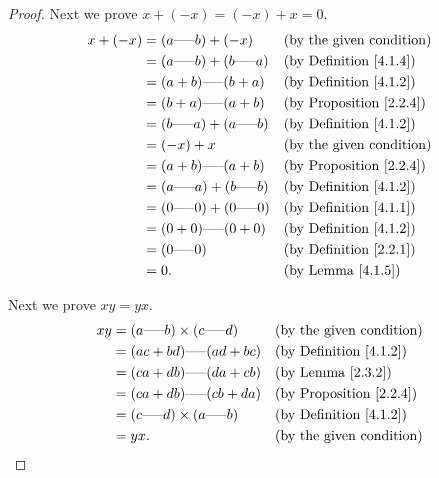 \begin{proof}
Next we prove \(x + (-x) = (-x) + x = 0\).
\begin{align*}
x + (-x) &= (a \text{-----} b) + (-x) && \text{(by the given condition)} \\
&= (a \text{-----} b) + (b \text{-----} a) && \text{(by Definition \ref{4.1.4})} \\
&= (a + b) \text{-----} (b + a) && \text{(by Definition \ref{4.1.2})} \\
&= (b + a) \text{-----} (a + b) && \text{(by Proposition \ref{2.2.4})} \\
&= (b \text{-----} a) + (a \text{-----} b) && \text{(by Definition \ref{4.1.2})} \\
&= (-x) + x && \text{(by the given condition)} \\
&= (a + b) \text{-----} (a + b) && \text{(by Proposition \ref{2.2.4})} \\
&= (a \text{-----} a) + (b \text{-----} b) && \text{(by Definition \ref{4.1.2})} \\
&= (0 \text{-----} 0) + (0 \text{-----} 0) && \text{(by Definition \ref{4.1.1})} \\
&= (0 + 0) \text{-----} (0 + 0) && \text{(by Definition \ref{4.1.2})} \\
&= (0 \text{-----} 0) && \text{(by Definition \ref{2.2.1})} \\
&= 0. && \text{(by Lemma \ref{4.1.5})}
\end{align*}

Next we prove \(xy = yx\).
\begin{align*}
xy &= (a \text{-----} b) \times (c \text{-----} d) && \text{(by the given condition)} \\
&= (ac + bd) \text{-----} (ad + bc) && \text{(by Definition \ref{4.1.2})} \\
&= (ca + db) \text{-----} (da + cb) && \text{(by Lemma \ref{2.3.2})} \\
&= (ca + db) \text{-----} (cb + da) && \text{(by Proposition \ref{2.2.4})} \\
&= (c \text{-----} d) \times (a \text{-----} b) && \text{(by Definition \ref{4.1.2})} \\
&= yx. && \text{(by the given condition)}
\end{align*}


\end{proof}
